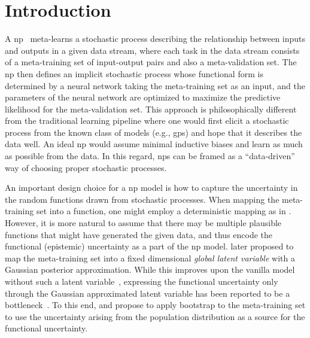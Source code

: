 \section{Introduction}
\label{main:sec:introduction}

\glsresetall

A \gls{np}~\citep{garnelo2018conditional,garnelo2018neural} meta-learns a stochastic process describing the relationship between inputs and outputs in a given data stream, where each task in the data stream consists of a meta-training set of input-output pairs and also a meta-validation set. The \gls{np} then defines an implicit stochastic process whose functional form is determined by a neural network taking the meta-training set as an input, and the parameters of the neural network are optimized to maximize the predictive likelihood for the meta-validation set. This approach is philosophically different from the traditional learning pipeline where one would first elicit a stochastic process from the known class of models (e.g., \glspl{gp}) and hope that it describes the data well. An ideal \gls{np} would assume minimal inductive biases and learn as much as possible from the data. In this regard, \glspl{np} can be framed as a ``data-driven'' way of choosing proper stochastic processes.

 An important design choice for a \gls{np} model is how to capture the uncertainty in the random functions drawn from stochastic processes. When mapping the meta-training set into a function, one might employ a deterministic mapping as in \citet{garnelo2018conditional}. However, it is more natural to assume that there may be multiple plausible functions that might have generated the given data, and thus encode the functional (epistemic) uncertainty as a part of the \gls{np} model. \citet{garnelo2018neural} later proposed to map the meta-training set into a fixed dimensional \emph{global latent variable} with a Gaussian posterior approximation. While this improves upon the vanilla model without such a latent variable~\citep{le2018empirical}, expressing the functional uncertainty only through the Gaussian approximated latent variable has been reported to be a bottleneck~\citep{louizos2019functional}. To this end, \citet{lee2020bootstrapping} and \citet{lee2022neural} propose to apply bootstrap to the meta-training set to use the uncertainty arising from the population distribution as a source for the functional uncertainty.

